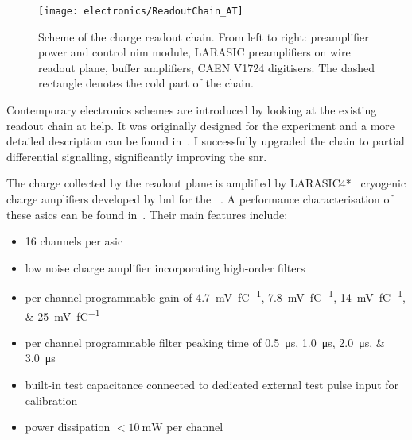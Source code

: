 
\begin{figure}[tbp]
	\centering
	\texttt{[image: electronics/ReadoutChain\_AT]}
	\caption[\AT{} charge readout chain]{%
		Scheme of the \AT{} charge readout chain.
		From left to right: preamplifier power and control \acrshort{nim} module, LARASIC preamplifiers on wire readout plane, buffer amplifiers, CAEN V1724 digitisers.
		The dashed rectangle denotes the cold part of the chain.~\cite{AT_larasic}
	}
	\label{fig:viper_readoutChain_AT}
\end{figure}

Contemporary electronics schemes are introduced by looking at the existing readout chain at \gls{help}.
It was originally designed for the \AT{} experiment and a more detailed description can be found in~\cite{AT_larasic}.
I successfully upgraded the chain to partial differential signalling, significantly improving the \gls{snr}.

The charge collected by the readout plane is amplified by LARASIC4*~\cite{larasic} cryogenic charge amplifiers developed by \gls{bnl} for the \uboone{}~\cite{uboone}.
A performance characterisation of these \glspl{asic} can be found in~\cite{AT_larasic}.
Their main features include:
\begin{itemize}
	\item \num{16} channels per \gls{asic}
	\item low noise charge amplifier incorporating high-order filters
	\item per channel programmable gain of \SIlist[list-final-separator = {, or }]{4.7; 7.8; 14; 25}{\milli\volt\per\femto\coulomb}
	\item per channel programmable filter peaking time of \SIlist[list-final-separator = {, or }]{0.5; 1.0; 2.0; 3.0}{\micro\second}
	\item built-in test capacitance connected to dedicated external test pulse input for calibration
	\item power dissipation $< \SI{10}{\milli\watt}$ per channel
\end{itemize}

